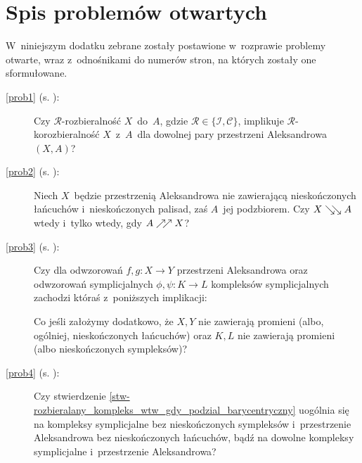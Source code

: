 \chapter*{Spis problemów otwartych}
W~niniejszym dodatku zebrane zostały postawione w~rozprawie problemy otwarte, wraz z~odnośnikami do numerów stron, na których zostały one sformułowane.

\begin{description}

\item[\ref{prob1} \normalfont (s. \pageref{prob1}):] Czy $\mathcal{R}$-rozbieralność $X$~do~$A$, gdzie $\mathcal{R}\in\{\mathcal{I},\mathcal{C}\}$, implikuje \mbox{$\mathcal{R}$-korozbieralność} $X$~z~$A$~dla dowolnej pary przestrzeni Aleksandrowa $(X,A)$?

\item[\ref{prob2} \normalfont (s. \pageref{prob2}):] Niech $X$~będzie przestrzenią Aleksandrowa nie zawierającą nieskończonych łańcuchów i~nieskończonych palisad, zaś $A$~jej podzbiorem. Czy $X\searrow\!\!\searrow A$ wtedy i~tylko wtedy, gdy $A\nearrow\!\!\nearrow X$?

\item[\ref{prob3} \normalfont (s. \pageref{prob3}):]Czy dla odwzorowań $f,g\colon X\to Y$ przestrzeni Aleksandrowa  oraz odwzorowań symplicjalnych $\phi, \psi\colon K\to L$ kompleksów symplicjalnych zachodzi któraś z~poniższych implikacji:
Co jeśli założymy dodatkowo, że $X,Y$ nie zawierają promieni (albo, ogólniej, nieskończonych łańcuchów) oraz $K,L$ nie zawierają promieni (albo nieskończonych sympleksów)?

\item[\ref{prob4} \normalfont (s. \pageref{prob4}):] Czy stwierdzenie \ref{stw-rozbieralany_kompleks_wtw_gdy_podzial_barycentryczny} uogólnia się na kompleksy symplicjalne bez nieskończonych sympleksów i~przestrzenie Aleksandrowa bez nieskończonych łańcuchów, bądź na dowolne kompleksy symplicjalne i~przestrzenie Aleksandrowa?


\end{description}
